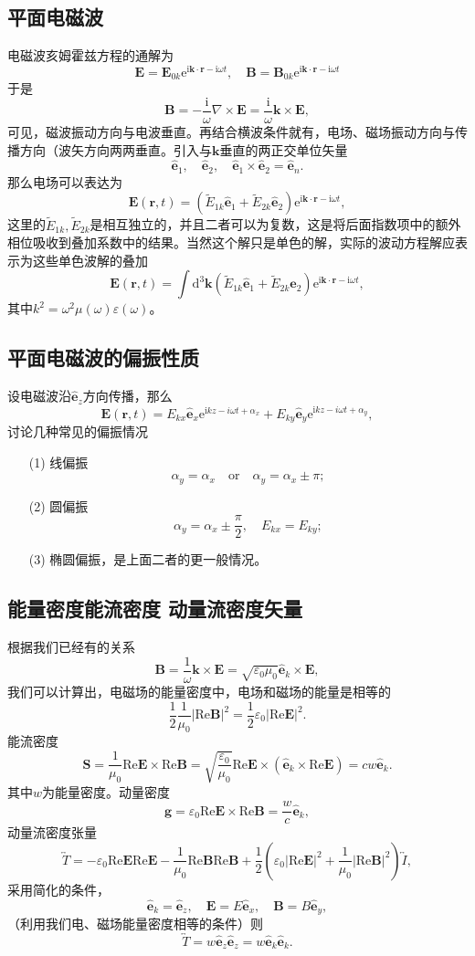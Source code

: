 \documentclass[UTF8]{ctexbook}
\newcommand{\e}{\mathrm{e}}
\renewcommand{\d}{\mathrm{d}}
\renewcommand{\b}{\boldsymbol}
\renewcommand{\i}{\mathrm{i}}
\renewcommand{\Re}{\mathrm{Re}}
\renewcommand{\t}{\overleftrightarrow}
\numberwithin{equation}{chapter}
\begin{document}
	\subsection{平面电磁波}
	电磁波亥姆霍兹方程的通解为
	\[\b{E}=\b{E}_{0k}\e^{\i\b{k}\cdot\b{r}-\i\omega t},\quad \b{B}=\b{B}_{0k}\e^{\i\b{k}\cdot\b{r}-\i\omega t}\]
	于是
	\[\b{B}=-\frac{\i}{\omega}\nabla\times\b{E}=\frac{\i}{\omega}\b{k}\times\b{E},\]
	可见，磁波振动方向与电波垂直。再结合横波条件就有，电场、磁场振动方向与传播方向（波矢方向两两垂直。引入与$\b{k}$垂直的两正交单位矢量
	\[\hat{\b{e}}_1,\quad \hat{\b{e}}_2,\quad \hat{\b{e}}_1\times\hat{\b{e}}_2=\hat{\b{e}}_n.\]
	那么电场可以表达为
	\[\b{E}(\b{r},t)=(\tilde{E}_{1k}\hat{\b{e}}_1+\tilde{E}_{2k}\hat{\b{e}}_2)\e^{\i\b{k}\cdot\b{r}-\i\omega t},\]
	这里的$\tilde{E}_{1k},\tilde{E}_{2k}$是相互独立的，并且二者可以为复数，这是将后面指数项中的额外相位吸收到叠加系数中的结果。当然这个解只是单色的解，实际的波动方程解应表示为这些单色波解的叠加
	\[\b{E}(\b{r},t)=\int\d^3\b{k}(\tilde{E}_{1k}\hat{\b{e}}_1+\tilde{E}_{2k}\hat{\b{e}}_2)\e^{\i\b{k}\cdot\b{r}-\i\omega t},\]
	其中$k^2=\omega^2\mu(\omega)\varepsilon(\omega)$。
	
	\subsection{平面电磁波的偏振性质}
	设电磁波沿$\hat{\b{e}}_z$方向传播，那么
	\[\b{E}(\b{r},t)=E_{kx}\hat{\b{e}}_x\e^{\i k z-i\omega t+\alpha_x}+E_{ky}\hat{\b{e}}_y\e^{\i k z-i\omega t+\alpha_y},\]
	讨论几种常见的偏振情况
	\begin{itemize}
		\item[(1)]线偏振
		\[\alpha_y=\alpha_x \quad \text{or} \quad \alpha_y=\alpha_x\pm\pi;\]
		\item[(2)]圆偏振
		\[\alpha_y=\alpha_x\pm\frac{\pi}{2},\quad E_{kx}=E_{ky};\]
		\item[(3)]椭圆偏振，是上面二者的更一般情况。
	\end{itemize}
	
	\subsection{能量密度\quad 能流密度 \quad 动量流密度矢量}
	根据我们已经有的关系
	\[\b{B}=\frac{1}{\omega}\b{k}\times\b{E}=\sqrt{\varepsilon_0\mu_0}\hat{\b{e}}_k\times\b{E},\]
	我们可以计算出，电磁场的能量密度中，电场和磁场的能量是相等的
	\[\frac{1}{2}\frac{1}{\mu_0}|\Re\b{B}|^2=\frac{1}{2}\varepsilon_0|\Re\b{E}|^2.\]
	能流密度
	\[\b{S}=\frac{1}{\mu_0}\Re \b{E}\times\Re\b{B}=\sqrt{\frac{\varepsilon_0}{\mu_0}}\Re \b{E}\times(\hat{\b{e}}_k\times\Re\b{E})=cw\hat{\b{e}}_k.\]
	其中$w$为能量密度。动量密度
	\[\b{g}=\varepsilon_0\Re\b{E}\times\Re\b{B}=\frac{w}{c}\hat{\b{e}}_k,\]
	动量流密度张量
	\[\t{T}=-\varepsilon_0\Re\b{E}\Re\b{E}-\frac{1}{\mu_0}\Re\b{B}\Re\b{B}+\frac{1}{2}\left(\varepsilon_0|\Re\b{E}|^2+\frac{1}{\mu_0}|\Re\b{B}|^2\right)\t{I},\]
	采用简化的条件，
	\[\hat{\b{e}}_k=\hat{\b{e}}_z,\quad \b{E}=E\hat{\b{e}}_x,\quad \b{B}=B\hat{\b{e}}_y,\]
	（利用我们电、磁场能量密度相等的条件）则
	\[\t{T}=w\hat{\b{e}}_z\hat{\b{e}}_z=w\hat{\b{e}}_k\hat{\b{e}}_k.\]
	
\end{document}
